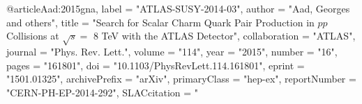 @article{Aad:2015gna,
      label          = "ATLAS-SUSY-2014-03",
      author         = "Aad, Georges and others",
      title          = "{Search for Scalar Charm Quark Pair Production in $pp$
                        Collisions at $\sqrt{s}=$ 8  TeV with the ATLAS Detector}",
      collaboration  = "ATLAS",
      journal        = "Phys. Rev. Lett.",
      volume         = "114",
      year           = "2015",
      number         = "16",
      pages          = "161801",
      doi            = "10.1103/PhysRevLett.114.161801",
      eprint         = "1501.01325",
      archivePrefix  = "arXiv",
      primaryClass   = "hep-ex",
      reportNumber   = "CERN-PH-EP-2014-292",
      SLACcitation   = "%
}

